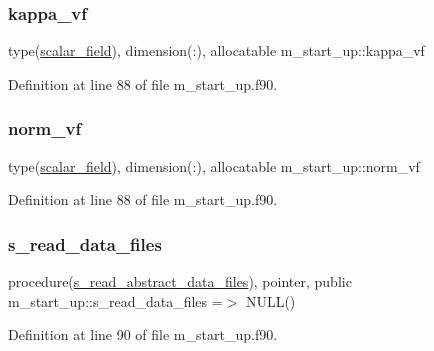 \subsubsection{\texorpdfstring{kappa\+\_\+vf}{kappa\_vf}}
{\footnotesize\ttfamily type(\hyperlink{structm__derived__types_1_1scalar__field}{scalar\+\_\+field}), dimension(\+:), allocatable m\+\_\+start\+\_\+up\+::kappa\+\_\+vf}



Definition at line 88 of file m\+\_\+start\+\_\+up.\+f90.

\mbox{\label{namespacem__start__up_ae380781597535aa125ff18847b85a206}} 
\subsubsection{\texorpdfstring{norm\+\_\+vf}{norm\_vf}}
{\footnotesize\ttfamily type(\hyperlink{structm__derived__types_1_1scalar__field}{scalar\+\_\+field}), dimension(\+:), allocatable m\+\_\+start\+\_\+up\+::norm\+\_\+vf}



Definition at line 88 of file m\+\_\+start\+\_\+up.\+f90.

\mbox{\label{namespacem__start__up_a76bcd559339a2dac17d36b71eb912556}} 
\subsubsection{\texorpdfstring{s\+\_\+read\+\_\+data\+\_\+files}{s\_read\_data\_files}}
{\footnotesize\ttfamily procedure(\hyperlink{interfacem__start__up_1_1s__read__abstract__data__files}{s\+\_\+read\+\_\+abstract\+\_\+data\+\_\+files}), pointer, public m\+\_\+start\+\_\+up\+::s\+\_\+read\+\_\+data\+\_\+files =$>$ N\+U\+LL()}



Definition at line 90 of file m\+\_\+start\+\_\+up.\+f90.

